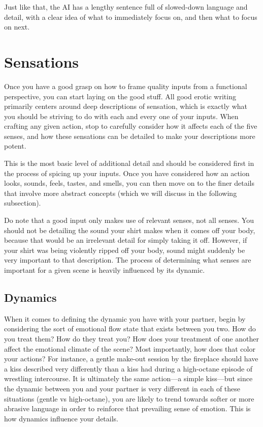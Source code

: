 ﻿\documentclass[Coomer-main.tex]{subfiles}
\begin{document}
Just like that, the AI has a lengthy sentence full of slowed-down language and detail, with a clear idea of what to immediately focus on, and then what to focus on next.

\section{Sensations}

Once you have a good grasp on how to frame quality inputs from a functional perspective, you can start laying on the good stuff.
All good erotic writing primarily centers around deep descriptions of sensation, which is exactly what you should be striving to do with each and every one of your inputs.
When crafting any given action, stop to carefully consider how it affects each of the five senses, and how these sensations can be detailed to make your descriptions more potent.

This is the most basic level of additional detail and should be considered first in the process of spicing up your inputs.
Once you have considered how an action looks, sounds, feels, tastes, and smells, you can then move on to the finer details that involve more abstract concepts (which we will discuss in the following subsection).

Do note that a good input only makes use of relevant senses, not all senses.
You should not be detailing the sound your shirt makes when it comes off your body, because that would be an irrelevant detail for simply taking it off.
However, if your shirt was being violently ripped off your body, sound might suddenly be very important to that description.
The process of determining what senses are important for a given scene is heavily influenced by its dynamic.

\subsection{Dynamics}

When it comes to defining the dynamic you have with your partner, begin by considering the sort of emotional flow state that exists between you two.
How do you treat them?
How do they treat you?
How does your treatment of one another affect the emotional climate of the scene?
Most importantly, how does that color your actions?
For instance, a gentle make-out session by the fireplace should have a kiss described very differently than a kiss had during a high-octane episode of wrestling intercourse.
It is ultimately the same action—a simple kiss—but since the dynamic between you and your partner is very different in each of these situations (gentle vs high-octane), you are likely to trend towards softer or more abrasive language in order to reinforce that prevailing sense of emotion.
This is how dynamics influence your details.
\end{document}

